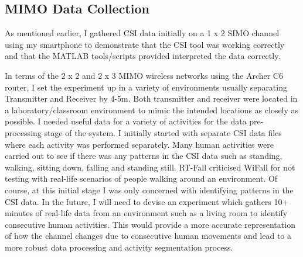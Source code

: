 \subsection{MIMO Data Collection}
As mentioned earlier, I gathered CSI data initially on a 1 x 2 SIMO channel using my smartphone to demonstrate that the CSI tool was working correctly and that the MATLAB tools/scripts provided interpreted the data correctly. \par 
In terms of the 2 x 2 and 2 x 3 MIMO wireless networks using the Archer C6 router, I set the experiment up in a variety of environments usually separating Transmitter and Receiver by 4-5m. Both transmitter and receiver were located in a laboratory/classroom environment to mimic the intended locations as closely as possible. I needed useful data for a variety of activities for the data pre-processing stage of the system. I initially started with separate CSI data files where each activity was performed separately. Many human activities were carried out to see if there was any patterns in the CSI data such as standing, walking, sitting down, falling and standing still. RT-Fall criticised WiFall for not testing with real-life scenarios of people walking around an environment. Of course, at this initial stage I was only concerned with identifying patterns in the CSI data. In the future, I will need to devise an experiment which gathers 10+ minutes of real-life data from an environment such as a living room to identify consecutive human activities. This would provide a more accurate representation of how the channel changes due to consecutive human movements and lead to a more robust data processing and activity segmentation process.

